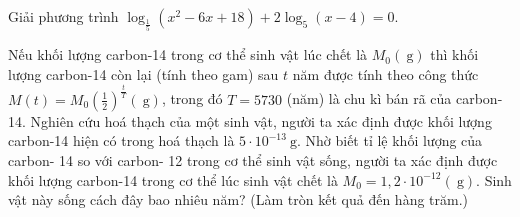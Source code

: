 
\TL
\begin{ex}%
	Giải phương trình $\log _{\frac{1}{5}}\left(x^2-6 x+18\right)+2 \log _5(x-4)=0$.
\end{ex}

\begin{ex}%
	Nếu khối lượng carbon-14 trong cơ thể sinh vật lúc chết là $M_0(\mathrm{~g})$ thì khối lượng carbon-14 còn lại (tính theo gam) sau $t$ năm được tính theo công thức $M(t)=M_0\left(\frac{1}{2}\right)^{\frac{t}{T}}(\mathrm{~g})$, trong đó $T=5730$ (năm) là chu kì bán rã của carbon-14. Nghiên cứu hoá thạch của một sinh vật, người ta xác định được khối lượng carbon-14 hiện có trong hoá thạch là $5 \cdot 10^{-13} \mathrm{~g}$. Nhờ biết tỉ lệ khối lượng của carbon- 14 so với carbon- 12 trong cơ thể sinh vật sống, người ta xác định được khối lượng carbon-14 trong cơ thể lúc sinh vật chết là $M_0=1,2 \cdot 10^{-12}(\mathrm{~g})$. Sinh vật này sống cách đây bao nhiêu năm? (Làm tròn kết quả đến hàng trăm.)
\end{ex}

